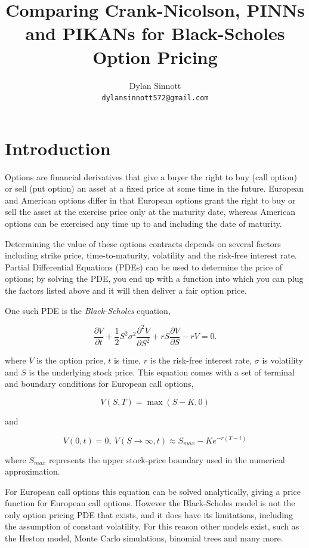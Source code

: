 \documentclass[11pt,a4paper]{article}
\title{Comparing Crank-Nicolson, PINNs and PIKANs for Black-Scholes Option Pricing}
\author{
Dylan Sinnott\\
\texttt{dylansinnott572@gmail.com}
}
\date{}
\begin{document}
\maketitle

\section{Introduction}

Options are financial derivatives that give a buyer the right to buy (call option) or sell (put option) an asset at a fixed price at some time in the future. European and American options differ in that European options grant the right to buy or sell the asset at the exercise price only at the maturity date, whereas American options can be exercised any time up to and including the date of maturity.

Determining the value of these options contracts depends on several factors including strike price, time-to-maturity, volatility and the risk-free interest rate. Partial Differential Equations (PDEs) can be used to determine the price of options; by solving the PDE, you end up with a function into which you can plug the factors listed above and it will then deliver a fair option price.

One such PDE is the \textit{Black-Scholes} equation,

\begin{equation}\label{eq:1}
    \frac{\partial V}{\partial t} + \frac{1}{2}S^2\sigma^2\frac{\partial^2V}{\partial S^2} + rS\frac{\partial V}{\partial S} - rV = 0.
\end{equation}

where $V$ is the option price, $t$ is time, $r$ is the risk-free interest rate, $\sigma$ is volatility and $S$ is the underlying stock price. This equation comes with a set of terminal and boundary conditions for European call options,

$$V(S,T) = \max(S-K, 0)$$

and

$$V(0,t) = 0, \ V(S \to \infty, t) \approx  S_{max} - K e^{-r(T-t)} $$

where $S_{max}$ represents the upper stock-price boundary used in the numerical approximation.

For European call options this equation can be solved analytically, giving a price function for European call options. However the Black-Scholes model is not the only option pricing PDE that exists, and it does have its limitations, including the assumption of constant volatility. For this reason other models exist, such as the Heston model, Monte Carlo simulations, binomial trees and many more.
\end{document}
